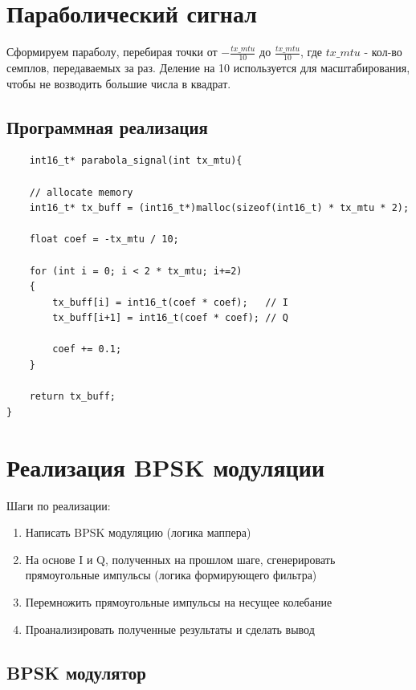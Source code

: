 \section{Параболический сигнал}

Сформируем параболу, перебирая точки от $-\frac{tx\_mtu}{10}$ до $\frac{tx\_mtu}{10}$, где $tx\_mtu$ - кол-во семплов,
передаваемых за раз. Деление на 10 используется для масштабирования, чтобы не возводить большие числа в квадрат.

\subsection{Программная реализация}

\begin{lstlisting}
    int16_t* parabola_signal(int tx_mtu){

    // allocate memory
    int16_t* tx_buff = (int16_t*)malloc(sizeof(int16_t) * tx_mtu * 2);

    float coef = -tx_mtu / 10;

    for (int i = 0; i < 2 * tx_mtu; i+=2)
    {
        tx_buff[i] = int16_t(coef * coef);   // I
        tx_buff[i+1] = int16_t(coef * coef); // Q

        coef += 0.1;
    }

    return tx_buff;
}
\end{lstlisting}


\section{Реализация BPSK модуляции}

Шаги по реализации:

\begin{enumerate}
    \item Написать BPSK модуляцию (логика маппера)
    \item На основе I и Q, полученных на прошлом шаге, сгенерировать прямоугольные импульсы (логика формирующего фильтра)
    \item Перемножить прямоугольные импульсы на несущее колебание
    \item Проанализировать полученные результаты и сделать вывод
\end{enumerate}

\subsection{BPSK модулятор}


